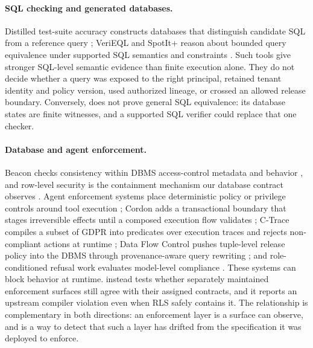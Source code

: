 \paragraph{SQL checking and generated databases.}
Distilled test-suite accuracy constructs databases that distinguish candidate SQL from a reference query \citep{test_suite_accuracy}; VeriEQL and SpotIt+ reason about bounded query equivalence under supported SQL semantics and constraints \citep{verieql,spotit}. Such tools give stronger SQL-level semantic evidence than finite execution alone. They do not decide whether a query was exposed to the right principal, retained tenant identity and policy version, used authorized lineage, or crossed an allowed release boundary. Conversely, \policystrata{} does not prove general SQL equivalence: its database states are finite witnesses, and a supported SQL verifier could replace that one checker.

\paragraph{Database and agent enforcement.}
Beacon checks consistency within DBMS access-control metadata and behavior \citep{beacon}, and row-level security is the containment mechanism our database contract observes \citep{postgresql_rls}. Agent enforcement systems place deterministic policy or privilege controls around tool execution \citep{pcas,progent}; Cordon adds a transactional boundary that stages irreversible effects until a composed execution flow validates \citep{cordon}; C-Trace compiles a subset of GDPR into predicates over execution traces and rejects non-compliant actions at runtime \citep{c_trace}; Data Flow Control pushes tuple-level release policy into the DBMS through provenance-aware query rewriting \citep{data_flow_control}; and role-conditioned refusal work evaluates model-level compliance \citep{role_conditioned_refusals}. These systems can block behavior at runtime. \policystrata{} instead tests whether separately maintained enforcement surfaces still agree with their assigned contracts, and it reports an upstream compiler violation even when RLS safely contains it. The relationship is complementary in both directions: an enforcement layer is a surface \policystrata{} can observe, and \policystrata{} is a way to detect that such a layer has drifted from the specification it was deployed to enforce.


